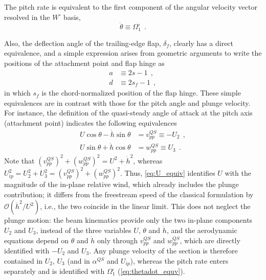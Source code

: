 \documentclass[12pt,a4paper,oneside,english]{abntex2} %
\newcommand{\fix}[1]{{\color{red}#1}}
\def\Ws{W^{\square}}
\def\Uip{U_{ip}}
\def\thetadot{\dot{\theta}}
\def\hdot{\dot{h}}
\begin{document}
The pitch rate is equivalent to the first component of the angular velocity vector resolved in the $\Ws$ basis,
\begin{equation}
    \thetadot \equiv \Omega_1^{\square} \ \ .
    \label{eq:thetadot_equv}
\end{equation}

Also, the deflection angle of the trailing-edge flap, $\delta_f$, clearly has a direct equivalence, and a simple expression arises from geometric arguments to write the positions of the attachment point and flap hinge as
\begin{align}
    a &\equiv 2s-1 \ \ ,
    \label{eq:a_equiv}
    \\
    d &\equiv 2s_f-1 \ \ ,
    \label{eq:d_equiv}
\end{align}
in which $s_f$ is the chord-normalized position of the flap hinge. These simple equivalences are in contrast with those for the pitch angle and plunge velocity. For instance, the definition of the quasi-steady angle of attack at the pitch axis (attachment point) indicates the following equivalences
\begin{align}
    U\cos\theta - \hdot\sin\theta &= v_{pp}^{QS} \equiv -U_2 \ \ ,
    \label{eq:v_pp_equiv}
    \\
    U\sin\theta + \hdot\cos\theta &= w_{pp}^{QS} \equiv U_3 \ \ .
    \label{eq:w_pp_equiv}
\end{align}
\fix{Note that $(v_{pp}^{QS})^2+(w_{pp}^{QS})^2=U^2+\hdot^2$, whereas $\Uip^2=U_2^2+U_3^2=(v_{pp}^{QS})^2+(w_{pp}^{QS})^2$. Thus, \cref{eq:U_equiv} identifies $U$ with the magnitude of the in-plane relative wind, which already includes the plunge contribution; it differs from the freestream speed of the classical formulation by $\mathcal{O}(\hdot^2/U^2)$, i.e., the two coincide in the linear limit. This does not neglect the plunge motion: the beam kinematics provide only the two in-plane components $U_2$ and $U_3$, instead of the three variables $U$, $\theta$ and $\hdot$, and the aerodynamic equations depend on $\theta$ and $\hdot$ only through $v_{pp}^{QS}$ and $w_{pp}^{QS}$, which are directly identified with $-U_2$ and $U_3$. Any plunge velocity of the section is therefore contained in $U_2$, $U_3$ (and in $\alpha^{QS}$ and $\Uip$), whereas the pitch rate enters separately and is identified with $\Omega_1^\square$ (\cref{eq:thetadot_equv}).}
\end{document}
